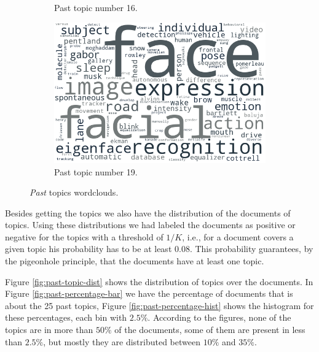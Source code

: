 \begin{figure}[h!]
\begin{subfigure}{0.49\textwidth}
		\caption{Past topic number 16.}
	\end{subfigure}%
	\hfill
	\begin{subfigure}{0.49\textwidth}
		\includegraphics[width=\linewidth]{01.Chapters/05.Results/past_19}
		\caption{Past topic number 19.}
	\end{subfigure}%
	\caption{\textit{Past} topics wordclouds.}
	\label{fig:past-wordcloud}
\end{figure}

Besides getting the topics we also have the distribution of the documents of topics. Using these distributions we had labeled the documents as positive or negative for the topics with a threshold of $1 / K$, i.e., for a document covers a given topic his probability has to be at least $0.08$. This probability guarantees, by the pigeonhole principle, that the documents have at least one topic.

Figure \ref{fig:past-topic-dist} shows the distribution of topics over the documents. In Figure \ref{fig:past-percentage-bar} we have the percentage of documents that is about the 25 past topics, Figure \ref{fig:past-percentage-hist} shows the histogram for these percentages, each bin with $2.5\%$. According to the figures, none of the topics are in more than $50\%$ of the documents, some of them are present in less than $2.5\%$, but mostly they are distributed between $10\%$ and $35\%$.

